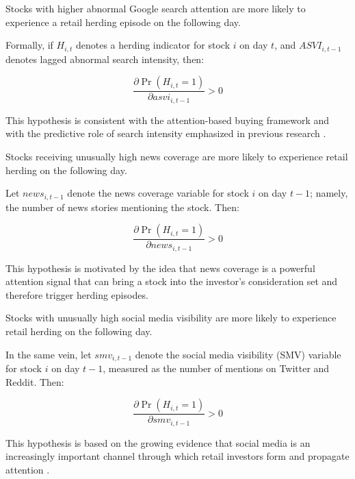\documentclass[12pt]{article}
\begin{document}
\begin{tcolorbox}[colback=blue!5!white, colframe=blue!75!black, title=Hypothesis 1]
  Stocks with higher abnormal Google search attention are more likely to experience a retail herding episode on the following day.
\end{tcolorbox}

Formally, if $H_{i,t}$ denotes a herding indicator for stock $i$ on day $t$, and $ASVI_{i,t-1}$ denotes lagged abnormal search intensity, then:

$$
\frac{\partial \Pr(H_{i,t}=1)}{\partial asvi_{i,t-1}} > 0
$$

This hypothesis is consistent with the attention-based buying framework
and with the predictive role of search intensity emphasized in previous
research \parencite{BarberEtal2022,ArdiaEtal2023,DaEtal2011}.

\begin{tcolorbox}[colback=blue!5!white, colframe=blue!75!black, title=Hypothesis 2]
  Stocks receiving unusually high news coverage are more likely to experience retail herding on the following day.
\end{tcolorbox}

Let $news_{i,t-1}$ denote the news coverage variable for stock $i$ on day $t - 1$; namely, the number of
news stories mentioning the stock. Then:

$$
\frac{\partial \Pr(H_{i,t}=1)}{\partial news_{i,t - 1}} > 0
$$

This hypothesis is motivated by the idea that news coverage is a powerful attention signal that can
bring a stock into the investor's consideration set \parencite{BarberOdean2008} and therefore trigger
herding episodes.

\begin{tcolorbox}[colback=blue!5!white, colframe=blue!75!black, title=Hypothesis 3]
  Stocks with unusually high social media visibility are more likely to experience retail herding on the following day.
\end{tcolorbox}

In the same vein, let $smv_{i,t-1}$ denote the social media visibility (SMV) variable
for stock $i$ on day $t - 1$, measured as the number of mentions on Twitter and Reddit. Then:

$$
\frac{\partial \Pr(H_{i,t}=1)}{\partial smv_{i,t - 1}} > 0
$$

This hypothesis is based on the growing evidence that social media is an increasingly important
channel through which retail investors form and propagate attention \parencite{DeGiorgiEtal2026,MunsterEtal2024}.
\end{document}
